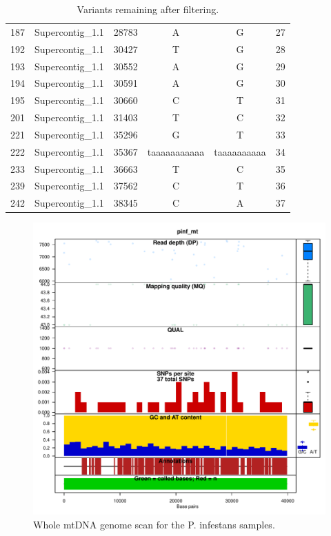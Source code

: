 \documentclass{article}\usepackage[]{graphicx}\usepackage[]{color}
\makeatletter
\def\maxwidth{ %
  \ifdim\Gin@nat@width>\linewidth
    \linewidth
  \else
    \Gin@nat@width
  \fi
}
\newenvironment{knitrout}{}{} %
\makeatother
\begin{document}
\begin{table}[ht]
\begin{tabular}{llcccc}
  187 & Supercontig\_1.1 & 28783 & A & G &  27 \\ 
  192 & Supercontig\_1.1 & 30427 & T & G &  28 \\ 
  193 & Supercontig\_1.1 & 30552 & A & G &  29 \\ 
  194 & Supercontig\_1.1 & 30591 & A & G &  30 \\ 
  195 & Supercontig\_1.1 & 30660 & C & T &  31 \\ 
  201 & Supercontig\_1.1 & 31403 & T & C &  32 \\ 
  221 & Supercontig\_1.1 & 35296 & G & T &  33 \\ 
  222 & Supercontig\_1.1 & 35367 & taaaaaaaaaaa & taaaaaaaaaa &  34 \\ 
  233 & Supercontig\_1.1 & 36663 & T & C &  35 \\ 
  239 & Supercontig\_1.1 & 37562 & C & T &  36 \\ 
  242 & Supercontig\_1.1 & 38345 & C & A &  37 \\ 
   \hline
\end{tabular}
\caption{Variants remaining after filtering.} 
\label{ptab}
\end{table}




\begin{knitrout}
\color{fgcolor}\begin{figure}[p]

\includegraphics[width=\maxwidth]{figure/chromogc} \caption[Whole mtDNA genome scan for the P]{Whole mtDNA genome scan for the P. infestans samples.\label{fig:chromogc}}
\end{figure}


\end{knitrout}
\end{document}
